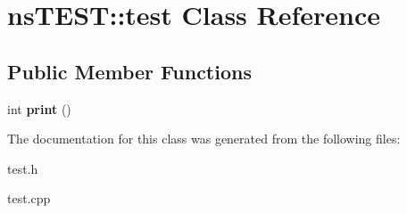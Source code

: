 \hypertarget{classnsTEST_1_1test}{\section{ns\-T\-E\-S\-T\-:\-:test \-Class \-Reference}
\label{classnsTEST_1_1test}
}
\subsection*{\-Public \-Member \-Functions}
\begin{DoxyCompactItemize}
\item 
\hypertarget{classnsTEST_1_1test_aa6e39f50e60aecae8157b32a78d53a7c}{int {\bfseries print} ()}\label{classnsTEST_1_1test_aa6e39f50e60aecae8157b32a78d53a7c}

\end{DoxyCompactItemize}


\-The documentation for this class was generated from the following files\-:\begin{DoxyCompactItemize}
\item 
test.\-h\item 
test.\-cpp\end{DoxyCompactItemize}
